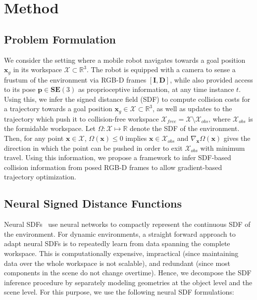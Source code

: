 \documentclass[letterpaper, 10 pt, conference]{ieeeconf}  %
\begin{document}
\section{Method}

\subsection{Problem Formulation}

We consider the setting where a mobile robot navigates towards a goal position $\mathbf{x}_g$ in its workspace $ \mathcal{X} \subset \mathbb{R}^3$.
The robot is equipped with a camera to sense a frustum of the environment via RGB-D frames $[ \mathbf{I}, \mathbf{D} ]$, while also provided access to its pose $\mathbf{p} \in \mathrm{\mathbf{SE}}(3)$ as proprioceptive information, at any time instance $t$.
Using this, we infer the signed distance field (SDF) to compute collision costs for a trajectory towards a goal position $\mathbf{x}_g \in \mathcal{X} \subset \mathbb{R}^3$, as well as updates to the trajectory which push it to collision-free workspace $\mathcal{X}_{free} = \mathcal{X} \setminus \mathcal{X}_{obs}$, where $\mathcal{X}_{obs}$ is the formidable workspace.
Let $\Omega: \mathcal{X} \mapsto \mathbb{R}$ denote the SDF of the environment.
Then, for any point $\mathbf{x} \in \mathcal{X}$, $\Omega(\mathbf{x}) \leq 0$ implies $\mathbf{x} \in \mathcal{X}_{obs}$ and $\nabla_{\mathbf{x}}\Omega(\mathbf{x})$ gives the direction in which the point can be pushed in order to exit $\mathcal{X}_{obs}$ with minimum travel.
Using this information, we propose a framework to infer SDF-based collision information from posed RGB-D frames to allow gradient-based trajectory optimization.

\subsection{Neural Signed Distance Functions}

Neural SDFs~\cite{deepsdf19,gropp2020implicit,isdf22} use neural networks to compactly represent the continuous SDF of the environment.
For dynamic environments, a straight forward approach to adapt neural SDFs is to repeatedly learn from data spanning the complete workspace.
This is computationally expensive, impractical (since maintaining data over the whole workspace is not scalable), and redundant (since most components in the scene do not change overtime).
Hence, we decompose the SDF inference procedure by separately modeling geometries at the object level and the scene level.
For this purpose, we use the following neural SDF formulations:
\end{document}
